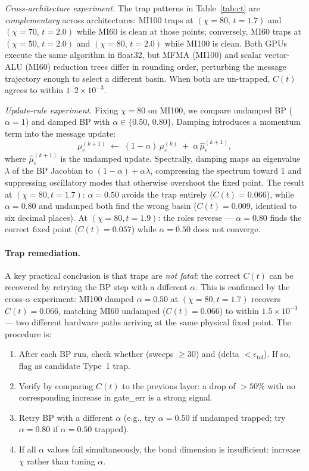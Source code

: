 \documentclass[11pt]{article}
\newcommand{\Ct}{C(t)}
\begin{document}
\emph{Cross-architecture experiment.}
The trap patterns in Table~\ref{tab:ct} are \emph{complementary} across
architectures: MI100 traps at $(\chi=80,\,t=1.7)$ and $(\chi=70,\,t=2.0)$
while MI60 is clean at those points; conversely, MI60 traps at
$(\chi=50,\,t=2.0)$ and $(\chi=80,\,t=2.0)$ while MI100 is clean.
Both GPUs execute the same algorithm in float32, but MFMA (MI100) and
scalar vector-ALU (MI60) reduction trees differ in rounding order,
perturbing the message trajectory enough to select a different basin.
When both are un-trapped, $\Ct$ agrees to within $1$--$2\times10^{-3}$.

\emph{Update-rule experiment.}
Fixing $\chi=80$ on MI100, we compare undamped BP ($\alpha=1$) and damped BP
with $\alpha \in \{0.50,\, 0.80\}$.
Damping introduces a momentum term into the message update:
\begin{equation}
  \mu_e^{(k+1)}
  \;\leftarrow\;
  (1-\alpha)\,\mu_e^{(k)} \;+\; \alpha\,\hat{\mu}_e^{(k+1)},
  \label{eq:damping}
\end{equation}
where $\hat{\mu}_e^{(k+1)}$ is the undamped update.
Spectrally, damping maps an eigenvalue $\lambda$ of the BP Jacobian to
$(1-\alpha) + \alpha\lambda$, compressing the spectrum toward 1 and
suppressing oscillatory modes that otherwise overshoot the fixed point.
The result at $(\chi=80, t=1.7)$: $\alpha=0.50$ avoids the trap entirely
($\Ct = 0.066$), while $\alpha=0.80$ and undamped both find the wrong basin
($\Ct = 0.009$, identical to six decimal places).
At $(\chi=80, t=1.9)$: the roles reverse --- $\alpha=0.80$ finds the correct
fixed point ($\Ct = 0.057$) while $\alpha=0.50$ does not converge.

\paragraph{Trap remediation.}
A key practical conclusion is that traps are \emph{not fatal}: the correct
$\Ct$ can be recovered by retrying the BP step with a different $\alpha$.
This is confirmed by the cross-$\alpha$ experiment: MI100 damped $\alpha=0.50$
at $(\chi=80, t=1.7)$ recovers $\Ct = 0.066$, matching MI60 undamped
($\Ct = 0.066$) to within $1.5\times10^{-3}$ --- two different hardware paths
arriving at the same physical fixed point.
The procedure is:
\begin{enumerate}
  \item After each BP run, check whether (sweeps $\geq 30$) and
        (delta $< \epsilon_{\mathrm{tol}}$).
        If so, flag as candidate Type~1 trap.
  \item Verify by comparing $\Ct$ to the previous layer: a drop of $>50\%$
        with no corresponding increase in gate\_err is a strong signal.
  \item Retry BP with a different $\alpha$ (e.g., try $\alpha=0.50$ if
        undamped trapped; try $\alpha=0.80$ if $\alpha=0.50$ trapped).
  \item If all $\alpha$ values fail simultaneously, the bond dimension is
        insufficient: increase $\chi$ rather than tuning $\alpha$.
\end{enumerate}
\end{document}
